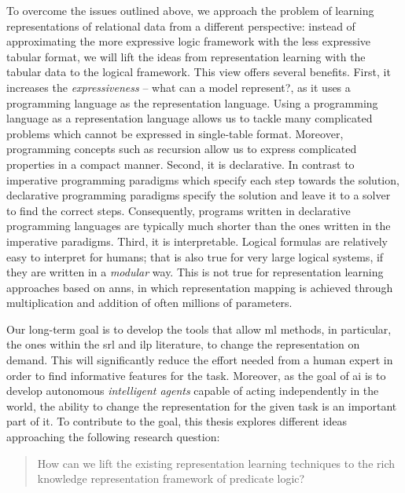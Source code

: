 To overcome the issues outlined above, we approach the problem of learning representations of relational data from a different perspective: instead of approximating the more expressive logic framework with the less expressive tabular format, we will lift the ideas from representation learning with the tabular data to the logical framework.
This view offers several benefits.
First, it  increases the \textit{expressiveness} -- what can a model represent?,  as it uses a programming language as the representation language.
Using a programming language as a representation language allows us to tackle many complicated problems which cannot be expressed in single-table format.
Moreover, programming concepts such as recursion allow us to express complicated properties in a compact manner.
Second, it is declarative.
In contrast to imperative programming paradigms which specify each step towards the solution, declarative programming paradigms specify the solution and leave it to a solver to find the correct steps.
Consequently, programs written in declarative programming languages are typically much shorter than the ones written in the imperative paradigms.
Third, it is interpretable.
Logical formulas are relatively easy to interpret for humans; that is also true for very large logical systems, if they are written in a \textit{modular} way.
This is not true for representation learning approaches based on \gls{ann}s, in which representation mapping is achieved through multiplication and addition of often millions of parameters.



Our long-term goal is to develop the tools that allow \gls{ml} methods, in particular, the ones within the \gls{srl} and \gls{ilp} literature, to change the representation on demand.
This will significantly reduce the effort needed from a human expert in order to find informative features for the task.
Moreover, as the goal of \gls{ai} is to develop autonomous \textit{intelligent agents} \cite{Russell:2009:AIM:1671238} capable of acting independently in the world, the ability to change the representation for the given task is an important part of it.
To contribute to the goal, this thesis explores different ideas approaching the following research question:

\begin{quote}
	How can we lift the existing representation learning techniques to the rich knowledge representation framework of predicate logic?
\end{quote}


